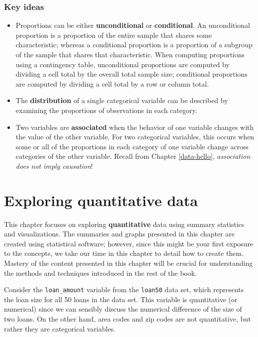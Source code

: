 \documentclass[
  10pt,
  openany]{book}
\theoremstyle{definition}
\theoremstyle{definition}
\theoremstyle{definition}
\theoremstyle{definition}
\theoremstyle{remark}
\begin{document}
\subsection*{Key ideas}\label{key-ideas-2}

\begin{itemize}
\item
  Proportions can be either \textbf{unconditional} or \textbf{conditional}. An unconditional proportion is a proportion of the entire sample that shares some characteristic; whereas a conditional proportion is a proportion of a subgroup of the sample that shares that characteristic. When computing proportions using a contingency table, unconditional proportions are computed by dividing a cell total by the overall total sample size; conditional proportions are computed by dividing a cell total by a row or column total.
\item
  The \textbf{distribution} of a single categorical variable can be described by examining the proportions of observations in each category.
\item
  Two variables are \textbf{associated} when the behavior of one variable changes with the value of the other variable. For two categorical variables, this occurs when some or all of the proportions in each category of one variable change across categories of the other variable. Recall from Chapter \ref{data-hello}, \emph{association does not imply causation}!
\end{itemize}

\chapter{Exploring quantitative data}\label{explore-numerical}

This chapter focuses on exploring \textbf{quantitative} data using summary statistics and visualizations.
The summaries and graphs presented in this chapter are created using statistical software; however, since this might be your first exposure to the concepts, we take our time in this chapter to detail how to create them.
Mastery of the content presented in this chapter will be crucial for understanding the methods and techniques introduced in the rest of the book.

Consider the \texttt{loan\_amount} variable from the \texttt{loan50} data set, which represents the loan size for all 50 loans in the data set.
This variable is quantitative (or numerical) since we can sensibly discuss the numerical difference of the size of two loans.
On the other hand, area codes and zip codes are not quantitative, but rather they are categorical variables.
\end{document}
